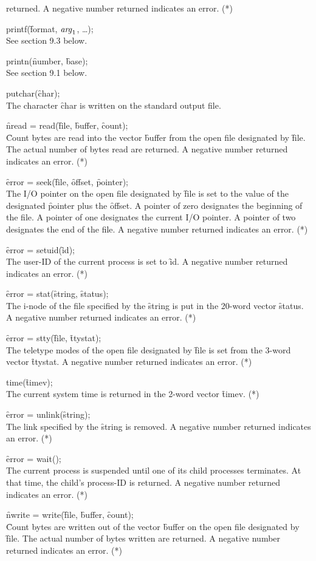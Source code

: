 \documentclass[12pt]{report}
\begin{document}
\begin{description}
  returned. A negative number returned indicates an error. (*)
\item[]printf(\f{format}, $\mathit{arg}_1$, \ldots); \hfill\\
  See section 9.3 below.
\item[]printn(\f{number}, \f{base}); \hfill\\
  See section 9.1 below.
\item[]putchar(\f{char}); \hfill\\
  The character \f{char} is written on the standard output file.
\item[]\f{nread} = read(\f{file}, \f{buffer}, \f{count}); \hfill\\
  \f{Count} bytes are read into the vector \f{buffer} from the open file
  designated by \f{file}. The actual number of bytes read are returned. A
  negative number returned indicates an error. (*)
\item[]\f{error} = seek(\f{file}, \f{offset}, \f{pointer}); \hfill\\
  The I/O pointer on the open file designated by \f{file} is set to the
  value of the designated \f{pointer} plus the \f{offset}. A pointer of zero
  designates the beginning of the file. A pointer of one designates
  the current I/O pointer. A pointer of two designates the end of the
  file. A negative number returned indicates an error. (*)
\item[]\f{error} = setuid(\f{id}); \hfill\\
  The user-ID of the current process is set to \f{id}. A negative number
  returned indicates an error. (*)
\item[]\f{error} = stat(\f{string}, \f{status}); \hfill\\
  The i-node of the file specified by the \f{string} is put in the 20-word
  vector \f{status}. A negative number returned indicates an error. (*)
\item[]\f{error} = stty(\f{file}, \f{ttystat}); \hfill\\
  The teletype modes of the open file designated by \f{file} is set from
  the 3-word vector \f{ttystat}. A negative number returned indicates an
  error. (*)
\item[]time(\f{timev}); \hfill\\
  The current system time is returned in the 2-word vector \f{timev}. (*)
\item[]\f{error} = unlink(\f{string}); \hfill\\
  The link specified by the \f{string} is removed. A negative number
  returned indicates an error. (*)
\item[]\f{error} = wait(); \hfill\\
  The current process is suspended until one of its child processes
  terminates. At that time, the child's process-ID is returned. A
  negative number returned indicates an error. (*)
\item[]\f{nwrite} = write(\f{file}, \f{buffer}, \f{count}); \hfill\\
  \f{Count} bytes are written out of the vector \f{buffer} on the open file
  designated by \f{file}. The actual number of bytes written are
  returned. A negative number returned indicates an error. (*)
\end{description}
\end{document}
